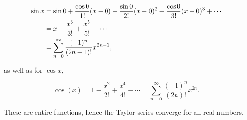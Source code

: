 \documentclass[11pt]{amsart}
\begin{document}
\begin{align}
\sin x &= \sin 0 + \frac{\cos 0}{1!}(x - 0) - \frac{\sin 0}{2!}(x - 0)^2 - \frac{\cos 0}{3!}(x - 0)^3 + \cdots \notag \\
&= x - \frac{x^3}{3!} + \frac{x^5}{5!} - \cdots \notag \\
&= \sum_{n=0}^{\infty}\frac{(-1)^n}{(2n + 1)!}x^{2n+1}, \notag
\end{align}

as well as for $\cos x$,

$$
\cos(x) = 1 - \frac{x^2}{2!} + \frac{x^4}{4!} - \cdots = \sum_{n=0}^{\infty}\frac{(-1)^n}{(2n)!}x^{2n}.
$$

These are entire functions, hence the Taylor series converge for all real numbers.

%
%
%
%
%
%
%
\end{document}

